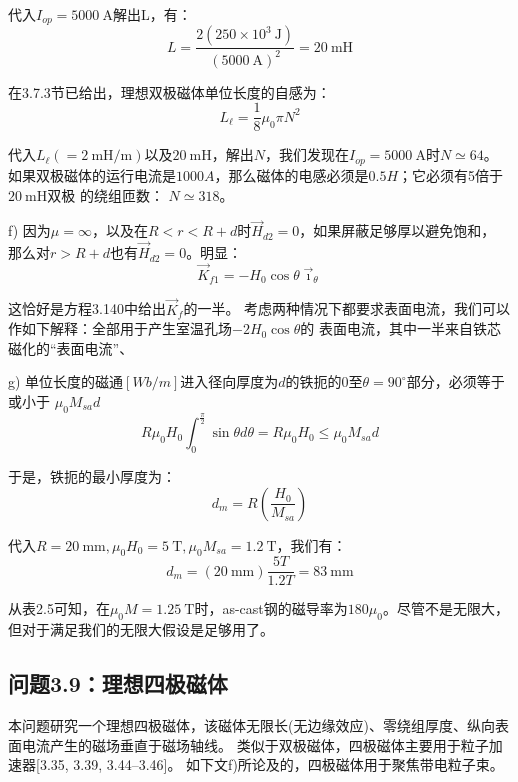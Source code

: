 代入$I_{op}=5000\ \mathrm{A}$解出L，有：
\begin{equation*}
L=\frac{2(250\times10^{3}\ \mathrm{J})}{(5000\ \mathrm{A})^{2}}=20\ \mathrm{mH}
\end{equation*}

在3.7.3节已给出，理想双极磁体单位长度的自感为： 
\begin{equation}
L_{\ell}=\frac{1}{8}\mu_{0}\pi N^{2}%
\end{equation}

代入$L_{\ell}(=2\ \mathrm{mH/m})$以及$20\ \mathrm{mH}$，解出$N$，我们发现在$I_{op} = 5000\ \mathrm{A}$时$N\simeq 64$。
如果双极磁体的运行电流是$1000A$，那么磁体的电感必须是$0.5H$；它必须有5倍于$20\ \mathrm{mH}$双极
的绕组匝数： $N\simeq 318$。

f) 因为$\mu=\infty$，以及在$R< r< R+d$时$\vec{H}_{d2}=0$，如果屏蔽足够厚以避免饱和，
那么对$r>R+d$也有$\vec{H}_{d2}=0$。明显：
\begin{equation}
\vec{K}_{f1}=-H_{0}\cos\theta\vec{\imath}_{\theta}%
\end{equation}

这恰好是方程3.140中给出$\vec{K}_f$的一半。
考虑两种情况下都要求表面电流，我们可以作如下解释：全部用于产生室温孔场$-2H_0\cos\theta$的
表面电流，其中一半来自铁芯磁化的“表面电流”、

g) 单位长度的磁通$[Wb/m]$进入径向厚度为$d$的铁扼的0至$\theta=90^\circ$部分，必须等于或小于
$\mu_0 M_{sa}d$
\begin{equation}
R\mu_{0}H_{0}\int_{0}^{\frac{\pi}{2}}\sin\theta d\theta=R\mu_{0}H_{0}\leq\mu_{0}M_{sa}d%
\end{equation}

于是，铁扼的最小厚度为：
\begin{equation}
d_{m}=R(\frac{H_{0}}{M_{sa}})%
\end{equation}

代入$R=20\ \mathrm{mm}, \mu_0 H_0=5\ \mathrm{T}, \mu_0 M_{sa}=1.2\ \mathrm{T}$，我们有：
\begin{equation*}
d_{m}=(20\ \mathrm{mm})\frac{5T}{1.2T}=83\ \mathrm{mm}
\end{equation*}

从表2.5可知，在$\mu_0 M=1.25\ \mathrm{T}$时，as-cast钢的磁导率为$180\mu_0$。尽管不是无限大，
但对于满足我们的无限大假设是足够用了。
\newpage

\subsection{问题3.9：理想四极磁体}
本问题研究一个理想四极磁体，该磁体无限长(无边缘效应)、零绕组厚度、纵向表面电流产生的磁场垂直于磁场轴线。
类似于双极磁体，四极磁体主要用于粒子加速器[3.35, 3.39, 3.44–3.46]。
如下文f)所论及的，四极磁体用于聚焦带电粒子束。

